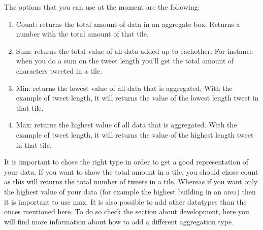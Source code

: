The options that you can use at the moment are the following:
\begin{enumerate}
	
\item Count: returns the total amount of data in an aggregate box. Returns a number with the total amount of that tile.
\item Sum: returns the total value of all data added up to eachother. For instance when you do a sum on the tweet length you'll get the total amount of characters tweeted in a tile.
\item Min: returns the lowest value of all data that is aggregated. With the example of tweet length, it will returns the value of the lowest length tweet in that tile.
\item Max: returns the highest value of all data that is aggregated. With the example of tweet length, it will returns the value of the highest length tweet in that tile.
\end{enumerate}

It is important to chose the right type in order to get a good representation of your data. If you want to show the total amount in a tile, you should chose count as this will returns the total number of tweets in a tile. Whereas if you want only the highest value of your data (for example the highest building in an area) then it is important to use max. It is also possible to add other datatypes than the onces mentioned here. To do so check the section about development, here you will find more information about how to add a different aggregation type.
